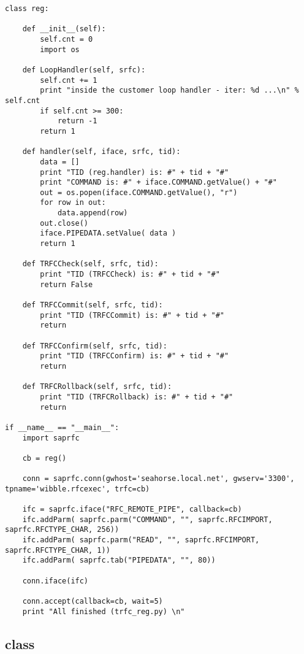 \documentclass{howto}
\begin{document}
\begin{verbatim}
class reg:

	def __init__(self):
		self.cnt = 0
		import os

	def LoopHandler(self, srfc):
		self.cnt += 1
		print "inside the customer loop handler - iter: %d ...\n" % self.cnt
		if self.cnt >= 300:
			return -1
		return 1

	def handler(self, iface, srfc, tid):
		data = []
		print "TID (reg.handler) is: #" + tid + "#"
		print "COMMAND is: #" + iface.COMMAND.getValue() + "#"
		out = os.popen(iface.COMMAND.getValue(), "r")
		for row in out:
			data.append(row)
		out.close()
		iface.PIPEDATA.setValue( data )
		return 1

	def TRFCCheck(self, srfc, tid):
		print "TID (TRFCCheck) is: #" + tid + "#"
		return False

	def TRFCCommit(self, srfc, tid):
		print "TID (TRFCCommit) is: #" + tid + "#"
		return

	def TRFCConfirm(self, srfc, tid):
		print "TID (TRFCConfirm) is: #" + tid + "#"
		return

	def TRFCRollback(self, srfc, tid):
		print "TID (TRFCRollback) is: #" + tid + "#"
		return

if __name__ == "__main__":
	import saprfc

	cb = reg()

	conn = saprfc.conn(gwhost='seahorse.local.net', gwserv='3300', tpname='wibble.rfcexec', trfc=cb)

	ifc = saprfc.iface("RFC_REMOTE_PIPE", callback=cb)
	ifc.addParm( saprfc.parm("COMMAND", "", saprfc.RFCIMPORT, saprfc.RFCTYPE_CHAR, 256))
	ifc.addParm( saprfc.parm("READ", "", saprfc.RFCIMPORT, saprfc.RFCTYPE_CHAR, 1))
	ifc.addParm( saprfc.tab("PIPEDATA", "", 80))

	conn.iface(ifc)

	conn.accept(callback=cb, wait=5)
	print "All finished (trfc_reg.py) \n"
\end{verbatim}



\subsection{class  \label{classconn}}
\end{document}
